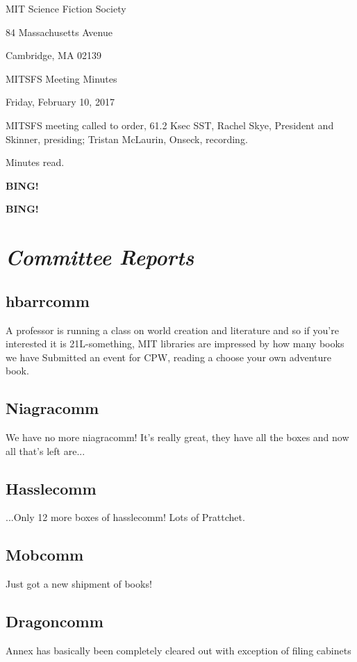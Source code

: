 \documentclass[10pt]{article}
\newcommand{\bing}{{\bf BING!} }
\newcommand{\goto}[1]{\bing \vskip 12pt \section*{{\em{#1}}}}
\newcommand{\skinner}{Rachel Skye, President and Skinner}
\newcommand{\onseck}{Tristan McLaurin, Onseck}
\newcommand{\meetingdate}{Friday, February 10, 2017}
\begin{document}
\begin{center}

MIT Science Fiction Society

84 Massachusetts Avenue

Cambridge, MA 02139

\vspace{12pt}

MITSFS Meeting Minutes

\meetingdate

\end{center}

\vspace{18pt}

\setlength{\parskip}{6pt}

\noindent
MITSFS meeting called to order, 61.2 Ksec SST,
\skinner, presiding; \onseck, recording.

Minutes read.

\bing

\goto{Committee Reports}
\subsection*{hbarrcomm}
A professor is running a class on world creation and literature and so if you're interested it is 21L-something, 
MIT libraries are impressed by how many books we have
Submitted an event for CPW, reading a choose your own adventure book.

\subsection*{Niagracomm}
We have no more niagracomm! It's really great, they have all the boxes and now all that's left are...

\subsection*{Hasslecomm}
...Only 12 more boxes of hasslecomm! Lots of Prattchet.

\subsection*{Mobcomm}
Just got a new shipment of books!

\subsection*{Dragoncomm}
Annex has basically been completely cleared out with exception of filing cabinets
\end{document}
